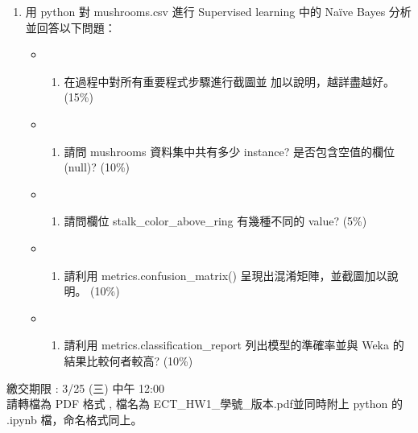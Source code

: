 \documentclass[11pt]{article}
\providecommand{\tightlist}{%
      \setlength{\itemsep}{0pt}\setlength{\parskip}{0pt}}
\begin{document}
    \begin{enumerate}
\def\labelenumi{\arabic{enumi}.}
\setcounter{enumi}{1}
\item
  用 python 對 mushrooms.csv 進行 Supervised learning 中的 Naïve Bayes
  分析 並回答以下問題：

  \begin{itemize}
  \item
    \begin{enumerate}
    \def\labelenumii{(\alph{enumii})}
    \tightlist
    \item
      在過程中對所有重要程式步驟進行截圖並 加以說明，越詳盡越好。 (15\%)
    \end{enumerate}
  \item
    \begin{enumerate}
    \def\labelenumii{(\alph{enumii})}
    \setcounter{enumii}{1}
    \tightlist
    \item
      請問 mushrooms 資料集中共有多少 instance?
      是否包含空值的欄位(null)? (10\%)
    \end{enumerate}
  \item
    \begin{enumerate}
    \def\labelenumii{(\alph{enumii})}
    \setcounter{enumii}{2}
    \tightlist
    \item
      請問欄位 stalk\_color\_above\_ring 有幾種不同的 value? (5\%)
    \end{enumerate}
  \item
    \begin{enumerate}
    \def\labelenumii{(\alph{enumii})}
    \setcounter{enumii}{3}
    \tightlist
    \item
      請利用 metrics.confusion\_matrix()
      呈現出混淆矩陣，並截圖加以說明。 (10\%)
    \end{enumerate}
  \item
    \begin{enumerate}
    \def\labelenumii{(\alph{enumii})}
    \setcounter{enumii}{4}
    \tightlist
    \item
      請利用 metrics.classification\_report 列出模型的準確率並與 Weka
      的結果比較何者較高? (10\%)
    \end{enumerate}
  \end{itemize}
\end{enumerate}

繳交期限 : 3/25 (三) 中午 12:00\\
請轉檔為 PDF 格式 , 檔名為 ECT\_HW1\_學號\_版本.pdf並同時附上 python 的
.ipynb 檔，命名格式同上。
\end{document}
